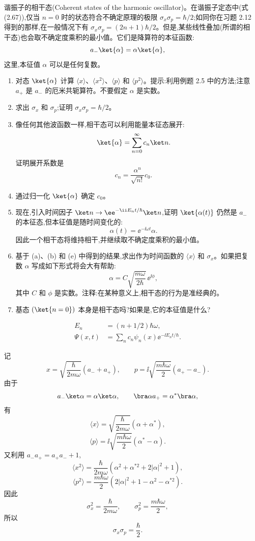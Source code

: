 \begin{question}
谐振子的相干态(Coherent states of the harmonic oscillator)。在谐振子定态中(式 (2.67)),仅当 $n=0$ 时的状态符合不确定原理的极限 $\sigma_x\sigma_p=\hbar/2$;如同你在习题 2.12 得到的那样,在一般情况下有 $\sigma_x\sigma_p=(2n+1)\hbar/2$。但是,某些线性叠加(所谓的相干态)也会取不确定度乘积的最小值。它们是降算符的本征函数:
\[
a_-\ket{\alpha}=\alpha\ket{\alpha},
\]
这里,本征值 $\alpha$ 可以是任何复数。
\begin{enumerate}
\item 对态 $\ket{\alpha}$ 计算 $\langle x\rangle$、$\langle x^2\rangle$、$\langle p\rangle$ 和 $\langle p^2\rangle$。提示:利用例题 2.5 中的方法;注意 $a_+$ 是 $a_-$ 的厄米共轭算符。不要假定 $\alpha$ 是实数。
\item 求出 $\sigma_x$ 和 $\sigma_p$;证明 $\sigma_x\sigma_p=\hbar/2$。
\item 像任何其他波函数一样,相干态可以利用能量本征态展开:
\[
\ket{\alpha}=\sum_{n=0}^{\infty}c_n\ket n.
\]
证明展开系数是
\[
c_n=\frac{\alpha^n}{\sqrt{n!}}c_0.
\]
\item 通过归一化 $\ket{\alpha}$ 确定 $c_0$。
\item 现在,引入时间因子 $\ket n\to \mathrm \ee^{-\ii E_nt/\hbar}\ket n$,证明 $\ket{\alpha(t)}$ 仍然是 $a_-$ 的本征态,但本征值是随时间变化的:
\[
\alpha(t)=\mathrm \ee^{-\ii\omega t}\alpha.
\]
因此一个相干态将维持相干,并继续取不确定度乘积的最小值。
\item 基于 (a)、(b) 和 (e) 中得到的结果,求出作为时间函数的 $\langle x\rangle$ 和 $\sigma_x$。如果把复数 $\alpha$ 写成如下形式将会大有帮助:
\[
\alpha=C\sqrt{\frac{m\omega}{2\hbar}}\,\mathrm \ee^{\ii\phi},
\]
其中 $C$ 和 $\phi$ 是实数。注释:在某种意义上,相干态的行为是准经典的。
\item 基态 $(\ket{n=0})$ 本身是相干态吗?如果是,它的本征值是什么?
\end{enumerate}

\par\smallskip
{}\[\begin{aligned}E_n&=(n+1/2)\hbar\omega,\\\Psi(x,t)&=\sum_n c_n\psi_n(x)\ee^{-\ii E_nt/\hbar}.\end{aligned}\]

\begin{solution}
记
\[
x=\sqrt{\frac{\hbar}{2m\omega}}(a_-+a_+),
\qquad
p=\ii\sqrt{\frac{m\hbar\omega}{2}}(a_+-a_-).
\]
由于
\[
a_-\ket\alpha=\alpha\ket\alpha,
\qquad
\bra\alpha a_+=\alpha^*\bra\alpha,
\]
有
\[
\langle x\rangle=\sqrt{\frac{\hbar}{2m\omega}}(\alpha+\alpha^*),
\]
\[
\langle p\rangle=\ii\sqrt{\frac{m\hbar\omega}{2}}(\alpha^*-\alpha).
\]
又利用 $a_-a_+=a_+a_-+1$,
\[
\langle x^2\rangle=\frac{\hbar}{2m\omega}
\left(\alpha^2+\alpha^{*2}+2|\alpha|^2+1\right),
\]
\[
\langle p^2\rangle=\frac{m\hbar\omega}{2}
\left(2|\alpha|^2+1-\alpha^2-\alpha^{*2}\right).
\]
因此
\[
\sigma_x^2=\frac{\hbar}{2m\omega},
\qquad
\sigma_p^2=\frac{m\hbar\omega}{2},
\]
所以
\[
\boxed{\sigma_x\sigma_p=\frac\hbar2.}
\]


\end{solution}
\end{question}
